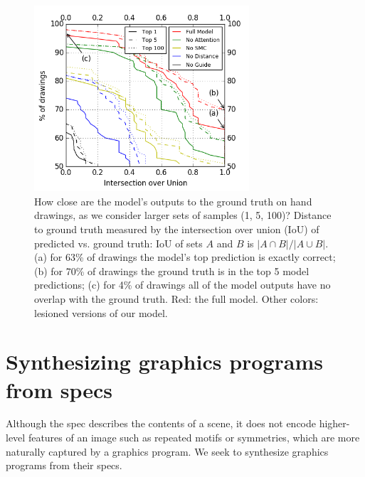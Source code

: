 \documentclass{article}
\theoremstyle{definition}
\begin{document}
\begin{figure}[h]\centering
  \begin{minipage}[c]{0.57\textwidth} 
    \centering  \includegraphics[width = 8cm]{figures/drawingAccuracy.png}            \vspace{-0.5cm} 
  \end{minipage}\hfill%
      \begin{minipage}[c]{0.4\textwidth} 
  \caption{How close are the model's outputs to the ground truth on hand drawings, as we consider larger sets of samples (1, 5, 100)?
    Distance to ground truth measured by the intersection over union (IoU) of predicted vs. ground truth: IoU of sets $A$ and $B$ is $|A\cap B|/|A\cup B|$. (a) for 63\% of drawings the model's top prediction is exactly correct; (b) for 70\% of drawings the ground truth is in the top 5 model predictions; (c) for 4\% of drawings all of the model outputs have no overlap with the ground truth. Red: the full model. Other colors: lesioned versions of our model.}\label{drawingIntersectionOverUnion}            \vspace{-0.5cm}
      \end{minipage}

\end{figure}






\section{Synthesizing graphics programs from specs}\label{programSynthesisSection}
Although the spec describes the contents
of a scene, it does not encode higher-level features of an image
such as repeated motifs or symmetries, which are more naturally captured by a graphics program.
We seek to synthesize graphics programs from their specs.
\end{document}
